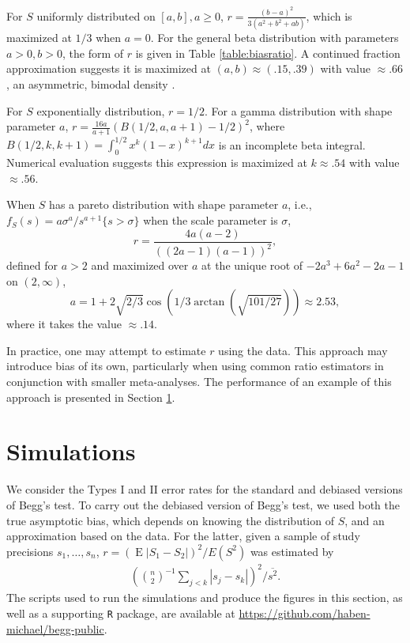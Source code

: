 \documentclass[12pt]{article}
\newcommand{\biasratio}{r}%
\newcommand{\s}{S}
\DeclareMathOperator{\E}{E}
\begin{document}
  For $S$ uniformly distributed on $[a,b], a\ge 0$,
  $\biasratio = \frac{(b-a)^2}{3(a^2+b^2+ab)}$, which is maximized at
  $1/3$ when $a=0$. For the general beta distribution with parameters
  $a>0,b>0$, the form of $\biasratio$ is given in Table
  \ref{table:biasratio}. A continued fraction approximation suggests
  it is maximized at $(a,b)\approx (.15,.39)$ with value
  $\approx .66$, an asymmetric, bimodal density %
  .
  
  For $S$ exponentially distribution, $\biasratio = 1/2$. For a gamma
  distribution with shape parameter $a$,
  $\biasratio=\frac{16a}{a+1}(B(1/2,a,a+1)-1/2)^2$, where
  $B(1/2,k,k+1)=\int_0^{1/2}x^k(1-x)^{k+1}dx$ is an incomplete beta
  integral. Numerical evaluation suggests this expression is maximized
  at $k\approx .54$ with value $\approx .56$.

  
  When $S$ has a pareto distribution with shape parameter $a$, i.e., $f_S(s) =a\sigma^a/s^{a+1}\{s>\sigma\}$ when the scale parameter is $\sigma$,
  $$
  \biasratio = \frac{4a(a-2)}{((2a-1)(a-1))^2},
  $$
  defined for $a>2$ and maximized over $a$ at the unique root of $-2a^3+6a^2-2a-1$ on $(2,\infty)$,
  $$
  a=1+2\sqrt{2/3}\cos\left( 1/3\arctan\left(\sqrt{101/27}\right)  \right) \approx 2.53,
  $$
  where it takes the value $\approx .14$.

  In practice, one may attempt to estimate $\biasratio$ using the
  data. This approach may introduce bias of its own, particularly when
  using common ratio estimators in conjunction with  smaller
  meta-analyses. The performance of an example of this approach is presented in Section \ref{section:simulations}.

  
\section{Simulations}
\label{section:simulations}
  We consider the Types I and II error rates for the standard and 
  debiased versions of Begg's test. To carry out the debiased version
  of Begg's test, we used both the true asymptotic bias, which depends
  on knowing the distribution of $\s$, and an approximation based on the
  data. For the latter, given a sample of study precisions
  $s_1,\ldots,s_n$, $\biasratio=(\E|\s_1-\s_2|)^2/E(\s^2)$ was estimated
  by
    \begin{align}
      \left({n\choose 2}^{-1}\sum_{j<k}|s_j-s_k|\right)^2\bigg/ \overline{s^2}.
    \end{align}
    The scripts used to run the simulations and produce the figures in
    this section, as well as a supporting \texttt{R} package, are
    available at \url{https://github.com/haben-michael/begg-public}.
\end{document}
